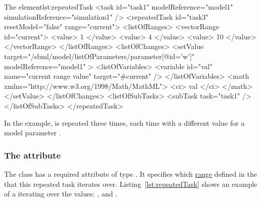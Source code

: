 


%
\begin{myXmlLst}{The  element}{lst:repeatedTask}
<task id="task1" modelReference="model1" simulationReference="simulation1" />
<repeatedTask id="task3" resetModel="false" range="current"> 
  <listOfRanges>
    <vectorRange id="current"> 
        <value> 1 </value> 
        <value> 4 </value> 
        <value> 10 </value> 
    </vectorRange> 
  </listOfRanges>
  <listOfChanges>
     <setValue target="/sbml/model/listOfParameters/parameter[@id='w']" modelReference="model1" > 
     <listOfVariables> 
         <variable id="val" name="current range value" target="#current" /> 
     </listOfVariables> 
     <math xmlns="http://www.w3.org/1998/Math/MathML"> 
         <ci> val </ci> 
     </math> 
    </setValue> 
</listOfChanges>
<listOfSubTasks>
  <subTask task="task1" />
</listOfSubTasks>
</repeatedTask>

\end{myXmlLst}
%
In the example,  is repeated three times, each time with a different value for a model parameter . 


\subsubsection{The  attribute}
\label{sec:rangeAttribute}
The  class has a required attribute  of type . It specifies which \hyperref[class:range]{range} defined in the  that this repeated task iterates over. Listing~\ref{lst:repeatedTask} shows an example of a  iterating over the values: ,  and .


